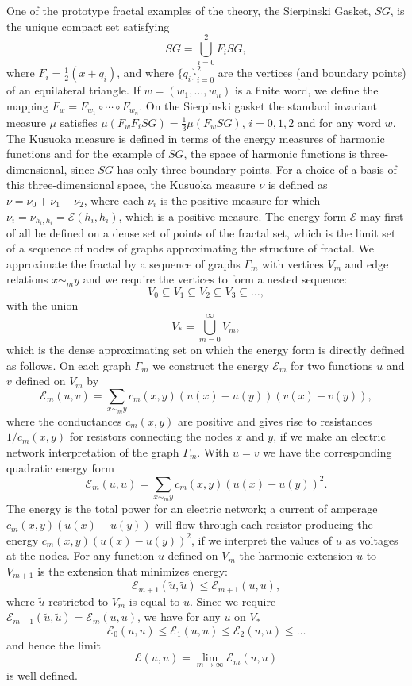 \documentclass[11pt]{scrartcl}
\theoremstyle{plain} %
\theoremstyle{definition}
\begin{document}
One of the prototype fractal examples of the theory, the Sierpinski Gasket, $SG$, is the unique compact set satisfying
$$SG=\bigcup_{i=0}^2 F_i SG,$$
where $F_i =\frac{1}{2}(x+q_i)$, and where $\{q_i\}_{i=0}^2$ are the vertices (and boundary points) of an equilateral triangle. If $w=(w_1,\ldots,w_n)$ is a finite word, we define the mapping $F_w=F_{w_1}\circ \cdots \circ F_{w_n}$. On the Sierpinski gasket the standard invariant measure $\mu$ satisfies $\mu(F_wF_i SG)=\frac{1}{3}\mu(F_w SG)$, $i=0,1,2$ and for any word $w$. 
The Kusuoka measure is defined in terms of the energy measures of harmonic functions and for the example of $SG$, the space of harmonic functions is three-dimensional, since $SG$ has only three boundary points. For a choice of a basis of this three-dimensional space, the Kusuoka measure $\nu$ is defined as $\nu=\nu_0+\nu_1+\nu_2$, where each $\nu_i$ is the positive measure for which $\nu_i=\nu_{h_i ,h_i}={\mathcal E} (h_i, h_i)$, which is a positive measure. The energy form ${\mathcal E}$ may first of all be defined on a dense set of points of the fractal set, which is the limit set of a sequence of nodes of graphs approximating the structure of fractal. We approximate the fractal by a sequence of graphs $\Gamma_m$ with vertices $V_m$ and edge relations $x \sim_m y$ and we require the vertices to form a nested sequence:
$$V_0\subseteq V_1 \subseteq V_2\subseteq V_3\subseteq\ldots,$$
with the union 
$$V_{*}=\bigcup_{m=0}^\infty V_m,$$
which is the dense approximating set on which the energy form is directly defined as follows. On each graph $\Gamma_m$ we construct the energy ${\mathcal E}_m$ for two functions $u$ and $v$ defined on $V_m$ by
$${\mathcal E}_m(u,v)=\sum_{x \sim_m y} c_m(x,y) (u(x)-u(y))(v(x)-v(y)),$$
where the conductances $c_m(x,y)$ are positive and gives rise to resistances $1/c_m(x,y)$ for resistors connecting the nodes $x$ and $y$, if we make an electric network interpretation of the graph $\Gamma_m$. With $u=v$ we have the corresponding quadratic energy form
$${\mathcal E}_m(u,u)=\sum_{x \sim_m y} c_m(x,y) (u(x)-u(y))^2.$$
The energy is the total power for an electric network; a current of amperage 
$c_m(x,y)(u(x)-u(y))$ will flow through each resistor producing the energy 
$c_m(x,y)(u(x)-u(y))^2$, if we interpret the values of $u$ as voltages at the nodes. For any function $u$ defined on $V_m$ the harmonic extension $\tilde u$ to $V_{m+1}$ is the extension that minimizes energy:
$${\mathcal E}_{m+1}(\tilde u, \tilde u)\leq {\mathcal E}_{m+1}(u,u),$$
where $\tilde u$ restricted to $V_m$ is equal to $u$. Since we require ${\mathcal E}_{m+1}(\tilde u, \tilde u)={\mathcal E}_m(u,u)$, we have for any $u$ on $V_{*}$
$${\mathcal E}_0(u,u) \leq {\mathcal E}_1(u,u)\leq {\mathcal E}_2(u,u)\leq \ldots$$
and hence the limit 
$${\mathcal E}(u,u)=\lim_{m\to\infty}{\mathcal E}_m(u,u)$$
is well defined.
\end{document}
